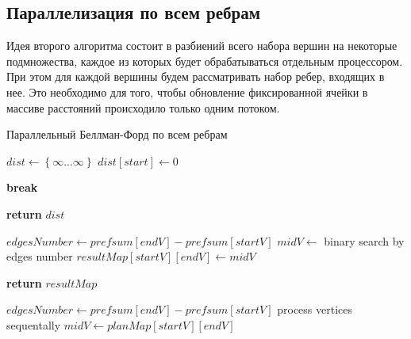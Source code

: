 \FloatBarrier
\subsection{Параллелизация по всем ребрам}
Идея второго алгоритма состоит в разбиений всего набора вершин на некоторые подмножества, каждое из которых будет обрабатываться отдельным процессором. При этом для каждой вершины будем рассматривать набор ребер, входящих в нее. Это необходимо для того, чтобы обновление фиксированной ячейки в массиве расстояний происходило только одним потоком. 

\FloatBarrier
\begin{algorithm}
\caption{Параллельный Беллман-Форд по всем ребрам}\label{bf_classic_par2}
\begin{algorithmic}[1]
\State $dist\gets \left\{ {\infty ... \infty}\right\}$
\State $dist[start] \gets 0$

		\State \textbf{break}
	\EndIf
		
\EndFor
\State \textbf{return} $dist$
\EndProcedure

\State 
{}  
\State $edgesNumber \gets prefsum[endV] - prefsum[startV]$
	\State $midV \gets $ binary search by edges number
	\State $resultMap[startV][endV] \gets midV$ 
\EndIf

\State \textbf{return} $resultMap$
\EndProcedure

\State 
{}  
\State $edgesNumber \gets prefsum[endV] - prefsum[startV]$
	\State process vertices sequentally 	
\Else	
	\State $midV \gets planMap[startV][endV]$ 
\EndIf

\EndProcedure

\end{algorithmic}
\end{algorithm}

